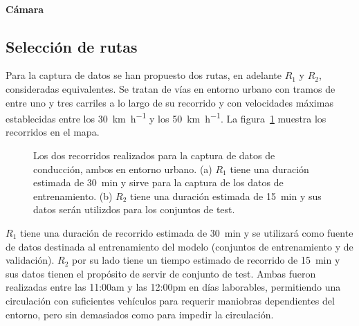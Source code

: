 
\paragraph{Cámara}




\subsection{Selección de rutas}

Para la captura de datos se han propuesto dos rutas, en adelante $R_1$ y $R_2$, consideradas equivalentes. Se tratan de vías en entorno urbano con tramos de entre uno y tres carriles a lo largo de su recorrido y con velocidades máximas establecidas entre los \SI{30}{\km\per\hour} y los \SI{50}{\km\per\hour}. La figura~\ref{fig:proposed-routes} muestra los recorridos en el mapa.

\begin{figure}
	\centering
	\qquad
	\caption[Dos recorridos para la captura de datos de conducción]{Los dos recorridos realizados para la captura de datos de conducción, ambos en entorno urbano. (a) $R_1$ tiene una duración estimada de \SI{30}{\minute} y sirve para la captura de los datos de entrenamiento. (b) $R_2$ tiene una duración estimada de \SI{15}{\minute} y sus datos serán utilizdos para los conjuntos de test.}
	\label{fig:proposed-routes}
\end{figure}

$R_1$ tiene una duración de recorrido estimada de \SI{30}{\minute} y se utilizará como fuente de datos destinada al entrenamiento del modelo (conjuntos de entrenamiento y de validación). $R_2$ por su lado tiene un tiempo estimado de recorrido de \SI{15}{\minute} y sus datos tienen el propósito de servir de conjunto de test. Ambas fueron realizadas entre las 11:00am y las 12:00pm en días laborables, permitiendo una circulación con suficientes vehículos para requerir maniobras dependientes del entorno, pero sin demasiados como para impedir la circulación.

